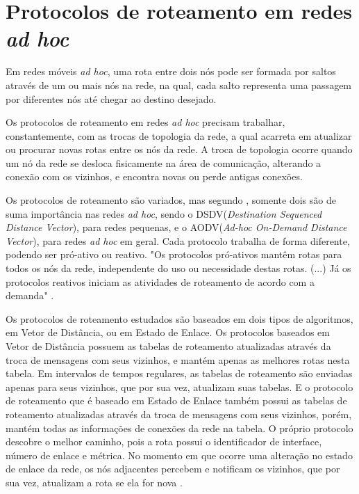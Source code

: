 \section{Protocolos de roteamento em redes \textit{ad hoc}}\label{protocols}

Em redes m\'oveis \textit{ad hoc}, uma rota entre dois n\'os pode ser formada por saltos atrav\'es de um ou mais n\'os na rede, na qual, cada salto representa uma passagem por diferentes n\'os at\'e chegar ao destino desejado. 

Os protocolos de roteamento em redes \textit{ad hoc} precisam trabalhar, constantemente, com as trocas de topologia da rede, a qual acarreta em atualizar ou procurar novas rotas entre os n\'os da rede. 
A troca de topologia ocorre quando um n\'o da rede se desloca fisicamente na \'area de comunica\c{c}\~ao, alterando a conex\~ao com os vizinhos, e encontra novas ou perde antigas conex\~oes.

Os protocolos de roteamento s\~ao variados, mas segundo \cite{gorantala}, somente dois s\~ao de suma import\^ancia nas redes \textit{ad hoc}, sendo o DSDV(\textit{Destination Sequenced Distance Vector}), para redes pequenas, e o AODV(\textit{Ad-hoc On-Demand Distance Vector}), para redes \textit{ad hoc} em geral. 
Cada protocolo trabalha de forma diferente, podendo ser pr\'o-ativo ou reativo. 
"Os protocolos pr\'o-ativos mant\^em rotas para todos os n\'os da rede, independente do uso ou necessidade destas rotas. (...) J\'a os protocolos reativos iniciam as atividades de roteamento de acordo com a demanda" \cite{pereira}.

Os protocolos de roteamento estudados s\~ao baseados em dois tipos de algoritmos, em Vetor de Dist\^ancia, ou em Estado de Enlace. 
Os protocolos baseados em Vetor de Dist\^ancia possuem as tabelas de roteamento atualizadas atrav\'es da troca de mensagens com seus vizinhos, e mant\'em apenas as melhores rotas nesta tabela. 
Em intervalos de tempos regulares, as tabelas de roteamento s\~ao enviadas apenas para seus vizinhos, que por sua vez, atualizam suas tabelas. 
E o protocolo de roteamento que \'e baseado em Estado de Enlace tamb\'em possui as tabelas de roteamento atualizadas atrav\'es da troca de mensagens com seus vizinhos, por\'em, mant\'em todas as informa\c{c}\~oes de conex\~oes da rede na tabela. 
O pr\'oprio protocolo descobre o melhor caminho, pois a rota possui o identificador de interface, n\'umero de enlace e m\'etrica. 
No momento em que ocorre uma altera\c{c}\~ao no estado de enlace da rede, os n\'os adjacentes percebem e notificam os vizinhos, que por sua vez, atualizam a rota se ela for nova \cite{posselt}.

